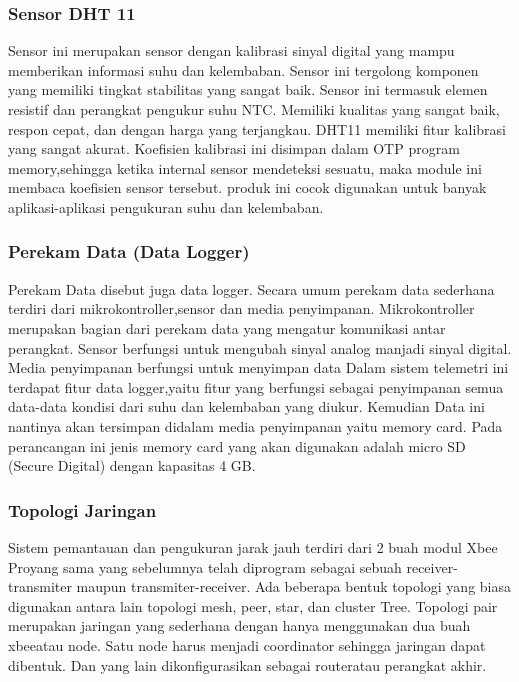 \subsubsection{Sensor DHT 11}
Sensor ini merupakan sensor dengan kalibrasi sinyal digital yang mampu memberikan informasi suhu dan kelembaban. Sensor ini tergolong komponen yang memiliki tingkat stabilitas yang sangat baik. Sensor ini termasuk elemen resistif dan perangkat pengukur suhu NTC.
Memiliki kualitas yang sangat baik, respon cepat, dan dengan harga yang
terjangkau. DHT11 memiliki fitur kalibrasi yang sangat akurat. Koefisien kalibrasi ini disimpan dalam OTP program memory,sehingga ketika internal sensor mendeteksi sesuatu, maka module ini membaca koefisien sensor tersebut. produk ini cocok digunakan untuk banyak aplikasi-aplikasi pengukuran suhu dan kelembaban.

\subsubsection{Perekam Data (Data Logger)}
 Perekam Data disebut juga data logger. Secara umum perekam data sederhana terdiri dari mikrokontroller,sensor dan media penyimpanan.
Mikrokontroller merupakan bagian dari perekam data yang mengatur komunikasi antar perangkat. Sensor berfungsi untuk mengubah sinyal analog manjadi sinyal digital. Media penyimpanan berfungsi untuk menyimpan data Dalam sistem telemetri ini terdapat fitur data logger,yaitu fitur yang berfungsi sebagai penyimpanan semua data-data kondisi dari suhu dan kelembaban yang diukur. Kemudian Data ini nantinya akan
tersimpan didalam media penyimpanan yaitu memory card. Pada perancangan ini jenis memory card yang akan digunakan adalah micro SD 
(Secure Digital) dengan kapasitas 4 GB.

\subsubsection{Topologi Jaringan}
Sistem pemantauan dan pengukuran jarak jauh terdiri dari 2 buah modul 
Xbee Proyang sama yang sebelumnya telah diprogram sebagai sebuah receiver-transmiter maupun transmiter-receiver. Ada beberapa bentuk topologi yang biasa digunakan antara lain topologi mesh, peer, star, dan cluster Tree.
Topologi pair merupakan jaringan yang sederhana dengan hanya menggunakan dua buah xbeeatau node. Satu node harus menjadi coordinator sehingga jaringan dapat dibentuk. Dan yang lain dikonfigurasikan sebagai routeratau perangkat akhir.

